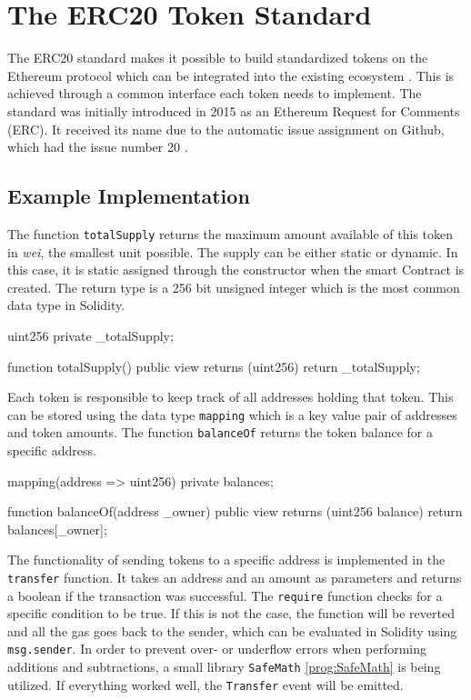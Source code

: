 \section{The ERC20 Token Standard}
\label{sec:ERC20}
The ERC20 standard makes it possible to build standardized tokens on the Ethereum protocol which can be integrated into the existing ecosystem \cite{ERC20}. This is achieved through a common interface each token needs to implement. The standard was initially introduced in 2015 as an Ethereum Request for Comments (ERC). It received its name due to the automatic issue assignment on Github, which had the issue number 20 \cite{AntonopoulosWood2018} \cite{BadrHorrocksWu2018}.

\subsection{Example Implementation}
The function \texttt{totalSupply} returns the maximum amount available of this token in \textit{wei}, the smallest unit possible. The supply can be either static or dynamic. In this case, it is static assigned through the constructor when the smart Contract is created. The return type is a 256 bit unsigned integer which is the most common data type in Solidity.

\begin{GenericCode}
 uint256 private _totalSupply;
  
 function totalSupply() public view returns (uint256) {
   return _totalSupply;
 }	
\end{GenericCode}

Each token is responsible to keep track of all addresses holding that token. This can be stored using the data type \texttt{mapping} which is a key value pair of addresses and token amounts. The function \texttt{balanceOf} returns the token balance for a specific address.

\begin{GenericCode}
 mapping(address => uint256) private balances;
  
 function balanceOf(address _owner) public view returns (uint256 balance) {
   return balances[_owner];
 }
\end{GenericCode}

The functionality of sending tokens to a specific address is implemented in the \texttt{transfer} function. It takes an address and an amount as parameters and returns a boolean if the transaction was successful. The \texttt{require} function checks for a specific condition to be true. If this is not the case, the function will be reverted and all the gas goes back to the sender, which can be evaluated in Solidity using \texttt{msg.sender}. In order to prevent over- or underflow errors when performing additions and subtractions, a small library \texttt{SafeMath} \ref{prog:SafeMath} is being utilized. If everything worked well, the \texttt{Transfer} event will be emitted.

